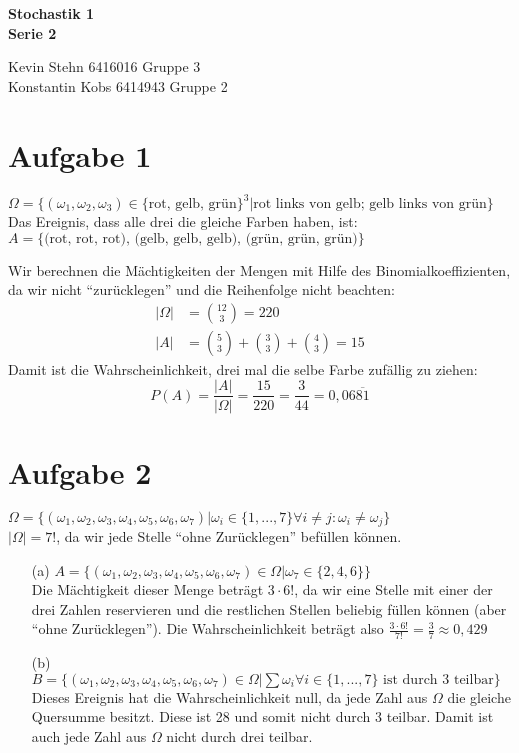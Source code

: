 \documentclass[10pt,a4paper]{article}
\begin{document}
\begin{center}
\textbf{Stochastik 1 \\ Serie 2 \\}
\end{center}

\begin{flushright}
Kevin Stehn 6416016 Gruppe 3 \\
Konstantin Kobs 6414943 Gruppe 2
\end{flushright}

\section*{Aufgabe 1}
$\Omega = \{(\omega_{1},\omega_{2},\omega_{3}) \in \{ \text{rot, gelb, grün}\}^3 | \text{rot links von gelb; gelb links von grün}\}$ \\
Das Ereignis, dass alle drei die gleiche Farben haben, ist:\\
$A = \{\text{(rot, rot, rot), (gelb, gelb, gelb), (grün, grün, grün)}\}$

Wir berechnen die Mächtigkeiten der Mengen mit Hilfe des Binomialkoeffizienten, da wir nicht ``zurücklegen'' und die Reihenfolge nicht beachten:
\begin{align*}
	|\Omega| &= \binom{12}{3} = 220\\
	|A| &= \binom{5}{3} + \binom{3}{3} +\binom{4}{3} = 15
\end{align*}
Damit ist die Wahrscheinlichkeit, drei mal die selbe Farbe zuf\"allig zu ziehen: \\
$$P(A) = \frac{|A|}{|\Omega|} = \frac{15}{220} = \frac{3}{44} = 0,06\overline{81}$$

\section*{Aufgabe 2}
$\Omega = \{(\omega_{1},\omega_{2},\omega_{3},\omega_{4},\omega_{5},\omega_{6},\omega_{7}) | \omega_{i} \in \{1,...,7\} \forall i \neq j : \omega_{i} \neq \omega_{j}\}$ \\
$|\Omega| = 7!$, da wir jede Stelle ``ohne Zurücklegen'' befüllen können.

\begin{itemize}
\item[(a)] $A = \{(\omega_{1},\omega_{2},\omega_{3},\omega_{4},\omega_{5},\omega_{6},\omega_{7}) \in \Omega | \omega_{7} \in \{2,4,6\}  \}$\\
Die Mächtigkeit dieser Menge beträgt $3 \cdot 6!$, da wir eine Stelle mit einer der drei Zahlen reservieren und die restlichen Stellen beliebig füllen können (aber ``ohne Zurücklegen''). Die Wahrscheinlichkeit beträgt also $\frac{3 \cdot 6!}{7!} = \frac{3}{7} \approx 0,429$
\item[(b)] $B = \{(\omega_{1},\omega_{2},\omega_{3},\omega_{4},\omega_{5},\omega_{6},\omega_{7}) \in \Omega |\sum \omega_{i} \forall i \in\{1,...,7\} \text{ ist durch 3 teilbar} \}$\\
Dieses Ereignis hat die Wahrscheinlichkeit null, da jede Zahl aus $\Omega$ die gleiche Quersumme besitzt. Diese ist 28 und somit nicht durch 3 teilbar. Damit ist auch jede Zahl aus $\Omega$ nicht durch drei teilbar.
\end{itemize}
\end{document}
